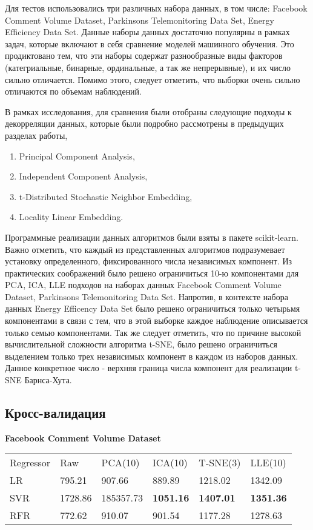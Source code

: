 \documentclass[runningheads]{llncs}
\begin{document}
Для тестов использовались три различных набора данных, в том числе: Facebook Comment Volume Dataset, Parkinsons Telemonitoring Data Set, Energy Efficiency Data Set. Данные наборы данных достаточно популярны в рамках задач, которые включают в себя сравнение моделей машинного обучения. Это продиктовано тем, что эти наборы содержат разнообразные виды факторов (категриальные, бинарные, ординальные, а так же непрерывные), и их число сильно отличается. Помимо этого, следует отметить, что выборки очень сильно отличаются по объемам наблюдений.\par

В рамках исследования, для сравнения были отобраны следующие подходы к декорреляции данных, которые были подробно рассмотрены в предыдущих разделах работы,
\begin{enumerate}
  \item Principal Component Analysis, 
  \item Independent Component Analysis,
  \item t-Distributed Stochastic Neighbor Embedding,
  \item Locality Linear Embedding.
\end{enumerate}

Программные реализации данных алгоритмов были взяты в пакете scikit-learn. Важно отметить, что каждый из представленных алгоритмов подразумевает установку определенного, фиксированного числа независимых компонент. Из практических соображений было решено ограничиться 10-ю компонентами для PCA, ICA, LLE подходов на наборах данных Facebook Comment Volume Dataset, Parkinsons Telemonitoring Data Set. Напротив, в контексте набора данных Energy Efficency Data Set было решено ограничиться только четырьмя компонентами в связи с тем, что в этой выборке каждое наблюдение описывается только семью компонентами. Так же следует отметить, что по причине высокой вычислительной сложности алгоритма t-SNE, было решено ограничиться выделением только трех независимых компонент в каждом из наборов данных. Данное конкретное число - верхняя граница числа компонент для реализации t-SNE Барнса-Хута.

\subsection{Кросс-валидация}
\textbf{Facebook Comment Volume Dataset}

\begin{table}[H]
\begin{tabular}{llllll}
Regressor & Raw     & PCA(10)   & ICA(10) & T-SNE(3) & LLE(10) \\
LR    & 795.21  & 907.66    & 889.89  & 1218.02  & 1342.09 \\
SVR   & 1728.86 & 185357.73 & \textbf{1051.16} & \textbf{1407.01}  & \textbf{1351.36} \\
RFR   & 772.62  & 910.07    & 901.54  & 1177.28  & 1278.63
\end{tabular}
\end{table}
\end{document}
